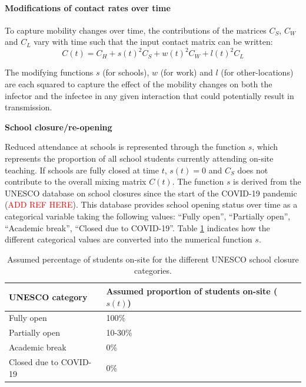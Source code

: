 \paragraph[blabla]{Modifications of contact rates over time}
To capture mobility changes over time, the contributions of the matrices \(C_{S}\), \(C_{W}\) and \(C_{L}\) vary with time such that the input contact matrix can be written:
\[C(t)= C_{H}+ s(t)^{2}C_{S}+ w(t)^{2}C_{W}+l(t)^{2}C_{L}\]

The modifying functions $s$ (for schools), $w$ (for work) and $l$ (for other-locations) are each squared to capture the effect of the mobility changes on 
both the infector and the infectee in any given interaction that could potentially result in transmission. 

\vspace{5pt}
\textbf{School closure/re-opening}

Reduced attendance at schools is represented through the function $s$, which represents the proportion of all school students 
currently attending on-site teaching. If schools are fully closed at time $t$, \(s(t)=0\) and \(C_{S}\) does not contribute to the overall 
mixing matrix \(C(t)\). 
The function $s$ is derived from the UNESCO database on school closures since the start of the COVID-19 pandemic (\textcolor{red}{ADD REF HERE}).
This database provides school opening status over time as a categorical variable taking the following values: ``Fully open'', ``Partially open'', ``Academic break'', ``Closed due to COVID-19''.
Table \ref{tab:unesco_categories} indicates how the different categorical values are converted into the numerical function $s$.

\begin{table}[ht]  
  \begin{center}
      \begin{tabular}{p{5cm} | p{5cm}}
          \hline
          \textbf{UNESCO category} & \textbf{Assumed proportion of students on-site ($s(t)$)} \\
          \hline
          Fully open & 100\% \\
          Partially open & 10-30\% \\
          Academic break & 0\% \\
          Closed due to COVID-19 & 0\% \\
          \hline
      \end{tabular}
    \end{center}
      \caption{Assumed percentage of students on-site for the different UNESCO school closure categories.}
      \label{tab:unesco_categories}
  \end{table}

